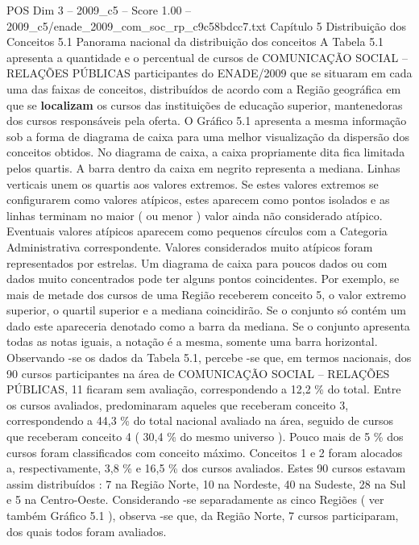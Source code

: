 \begin{textsample}{POS Dim 3 – 2009\_c5 – Score 1.00 – 2009\_c5/enade\_2009\_com\_soc\_rp\_c9c58bdcc7.txt}  \label{ex:f3_pos_136}
Capítulo 5 Distribuição dos Conceitos 5.1 Panorama nacional da distribuição dos conceitos A Tabela 5.1 apresenta a quantidade e o percentual de cursos de COMUNICAÇÃO SOCIAL – RELAÇÕES PÚBLICAS participantes do ENADE/2009 que se situaram em cada uma das faixas de conceitos, distribuídos de acordo com a Região geográfica em que se \textbf{localizam} os cursos das instituições de educação superior, mantenedoras dos cursos responsáveis pela oferta.
O Gráfico 5.1 apresenta a mesma informação sob a forma de diagrama de caixa para uma melhor visualização da dispersão dos conceitos obtidos.
No diagrama de caixa, a caixa propriamente dita fica limitada pelos quartis.
A barra dentro da caixa em negrito representa a mediana.
Linhas verticais unem os quartis aos valores extremos.
Se estes valores extremos se configurarem como valores atípicos, estes aparecem como pontos isolados e as linhas terminam no maior ( ou menor ) valor ainda não considerado atípico.
Eventuais valores atípicos aparecem como pequenos círculos com a Categoria Administrativa correspondente.
Valores considerados muito atípicos foram representados por estrelas.
Um diagrama de caixa para poucos dados ou com dados muito concentrados pode ter alguns pontos coincidentes.
Por exemplo, se mais de metade dos cursos de uma Região receberem conceito 5, o valor extremo superior, o quartil superior e a mediana coincidirão.
Se o conjunto só contém um dado este apareceria denotado como a barra da mediana.
Se o conjunto apresenta todas as notas iguais, a notação é a mesma, somente uma barra horizontal.
Observando -se os dados da Tabela 5.1, percebe -se que, em termos nacionais, dos 90 cursos participantes na área de COMUNICAÇÃO SOCIAL – RELAÇÕES PÚBLICAS, 11 ficaram sem avaliação, correspondendo a 12,2 \% do total.
Entre os cursos avaliados, predominaram aqueles que receberam conceito 3, correspondendo a 44,3 \% do total nacional avaliado na área, seguido de cursos que receberam conceito 4 ( 30,4 \% do mesmo universo ).
Pouco mais de 5 \% dos cursos foram classificados com conceito máximo.
Conceitos 1 e 2 foram alocados a, respectivamente, 3,8 \% e 16,5 \% dos cursos avaliados.
Estes 90 cursos estavam assim distribuídos : 7 na Região Norte, 10 na Nordeste, 40 na Sudeste, 28 na Sul e 5 na Centro-Oeste.
Considerando -se separadamente as cinco Regiões ( ver também Gráfico 5.1 ), observa -se que, da Região Norte, 7 cursos participaram, dos quais todos foram avaliados.

\end{textsample}
